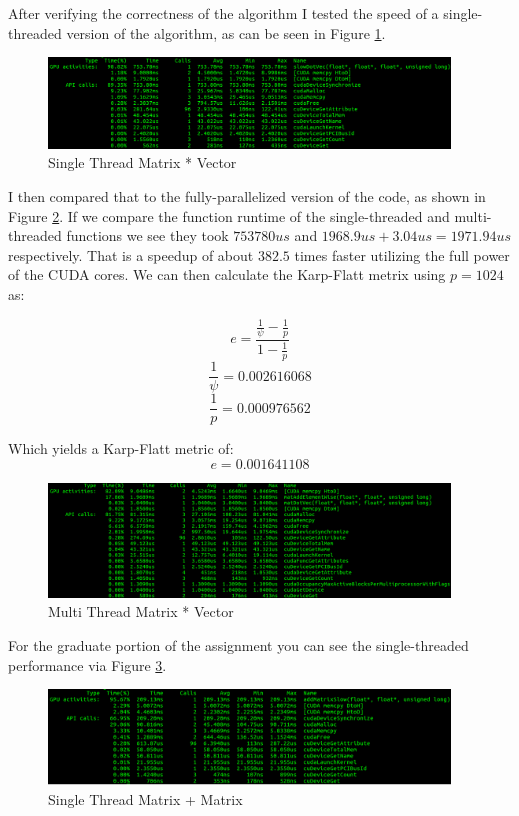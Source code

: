 \documentclass{article}
\begin{document}
After verifying the correctness of the algorithm I tested the speed of a 
single-threaded version of the algorithm, as can be seen in Figure \ref{fig:slow}.

\begin{figure}[h]
    \centering
    \includegraphics[width=0.95\textwidth]{slow}
    \caption{Single Thread Matrix * Vector}
    \label{fig:slow}
\end{figure}

I then compared that to the fully-parallelized version of the code, as shown in 
Figure \ref{fig:fast}. If we compare the function runtime of the single-threaded 
and multi-threaded functions we see they took $753780us$ and 
$1968.9us + 3.04us = 1971.94us$ respectively. That is a speedup of about $382.5$ 
times faster utilizing the full power of the CUDA cores. We can then calculate 
the Karp-Flatt metrix using $p=1024$ as:

$$e = \frac{\frac{1}{\psi} - \frac{1}{p}}{1 - \frac{1}{p}}$$
$$\frac{1}{\psi} = 0.002616068$$
$$\frac{1}{p} = 0.000976562$$

Which yields a Karp-Flatt metric of:
$$e = 0.001641108$$

\begin{figure}[h]
    \centering
    \includegraphics[width=0.95\textwidth]{fast}
    \caption{Multi Thread Matrix * Vector}
    \label{fig:fast}
\end{figure}

For the graduate portion of the assignment you can see the single-threaded 
performance via Figure \ref{fig:slowGrad}.

\begin{figure}[h]
    \centering
    \includegraphics[width=0.95\textwidth]{slowGrad}
    \caption{Single Thread Matrix + Matrix}
    \label{fig:slowGrad}
\end{figure}
\end{document}
